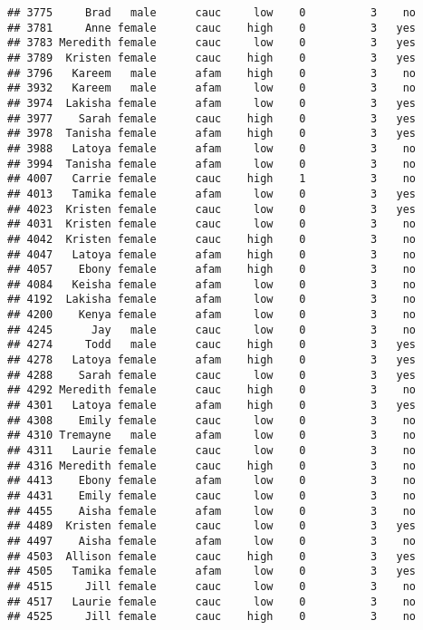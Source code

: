 \documentclass[
]{article}
\begin{document}
\begin{verbatim}
## 3775     Brad   male      cauc     low    0          3    no
## 3781     Anne female      cauc    high    0          3   yes
## 3783 Meredith female      cauc     low    0          3   yes
## 3789  Kristen female      cauc    high    0          3   yes
## 3796   Kareem   male      afam    high    0          3    no
## 3932   Kareem   male      afam     low    0          3    no
## 3974  Lakisha female      afam     low    0          3   yes
## 3977    Sarah female      cauc    high    0          3   yes
## 3978  Tanisha female      afam    high    0          3   yes
## 3988   Latoya female      afam     low    0          3    no
## 3994  Tanisha female      afam     low    0          3    no
## 4007   Carrie female      cauc    high    1          3    no
## 4013   Tamika female      afam     low    0          3   yes
## 4023  Kristen female      cauc     low    0          3   yes
## 4031  Kristen female      cauc     low    0          3    no
## 4042  Kristen female      cauc    high    0          3    no
## 4047   Latoya female      afam    high    0          3    no
## 4057    Ebony female      afam    high    0          3    no
## 4084   Keisha female      afam     low    0          3    no
## 4192  Lakisha female      afam     low    0          3    no
## 4200    Kenya female      afam     low    0          3    no
## 4245      Jay   male      cauc     low    0          3    no
## 4274     Todd   male      cauc    high    0          3   yes
## 4278   Latoya female      afam    high    0          3   yes
## 4288    Sarah female      cauc     low    0          3   yes
## 4292 Meredith female      cauc    high    0          3    no
## 4301   Latoya female      afam    high    0          3   yes
## 4308    Emily female      cauc     low    0          3    no
## 4310 Tremayne   male      afam     low    0          3    no
## 4311   Laurie female      cauc     low    0          3    no
## 4316 Meredith female      cauc    high    0          3    no
## 4413    Ebony female      afam     low    0          3    no
## 4431    Emily female      cauc     low    0          3    no
## 4455    Aisha female      afam     low    0          3    no
## 4489  Kristen female      cauc     low    0          3   yes
## 4497    Aisha female      afam     low    0          3    no
## 4503  Allison female      cauc    high    0          3   yes
## 4505   Tamika female      afam     low    0          3   yes
## 4515     Jill female      cauc     low    0          3    no
## 4517   Laurie female      cauc     low    0          3    no
## 4525     Jill female      cauc    high    0          3    no

\end{verbatim}
\end{document}
